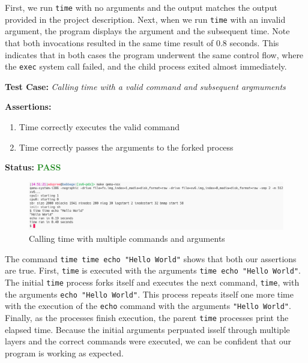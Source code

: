 \documentclass[11pt,letterpaper]{report}
\newcommand{\code}[1]{\colorbox{codegray}{\texttt{#1}}}
\begin{document}
{  First, we run \code{time} with no arguments and the output matches the output provided
  in the project description. Next, when we run \code{time} with an invalid argument, the
  program displays the argument and the subsequent time. Note that both invocations resulted
  in the same time result of 0.8 seconds. This indicates that in both cases the program 
  underwent the same control flow, where the \code{exec} system call failed, and the child 
  process exited almost immediately.

  \pagebreak

  \noindent\textbf{Test Case:} \emph{Calling time with a valid command and subsequent argmuments}
  
  \noindent\textbf{Assertions:}
  \begin{enumerate}[]
  \item Time correctly executes the valid command
  \item Time correctly passes the arguments to the forked process
  \end{enumerate}  
  
  \noindent\textbf{Status:} \textcolor{ForestGreen}{\textbf{PASS}}
  
  \begin{figure}[h!]
	\centering
	\includegraphics[width=1\linewidth]{time2.png}
	\caption[img]{Calling time with multiple commands and arguments}
	\label{fig:P1compileP0-1}
  \end{figure}

  The command \code{time time echo "Hello World"} shows that both our assertions are true. 
  First, \code{time} is executed with the arguments \code{time echo "Hello World"}. The 
  initial \code{time} process forks itself and executes the next command, \code{time}, 
  with the arguments \code{echo "Hello World"}. This process repeats itself one more time
  with the execution of the \code{echo} command with the arguments \code{"Hello World"}. 
  Finally, as the processes finish execution, the parent \code{time} processes print
  the elapsed time. Because the initial arguments perpuated isself through multiple layers
  and the correct commands were executed, we can be confident that our program is working 
  as expected.\\

}
\end{document}
